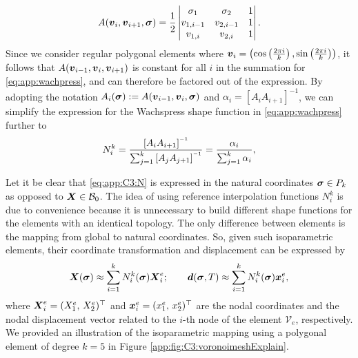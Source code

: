 %
\begin{equation}
A({\boldsymbol{v}}_{i}, {\boldsymbol{v}}_{i+1}, \boldsymbol{\sigma}) = \frac{1}{2} \left| \begin{matrix}
\sigma_1 & \sigma_2 & 1 \\
v_{1,i-1} & v_{2,i-1} & 1 \\
v_{1,i} & v_{2,i} & 1 \\
\end{matrix} \right|.
\end{equation}
%
Since we consider regular polygonal elements where ${\boldsymbol{v}}_i = \left(\cos\left(\frac{2\pi i}{k}\right), \sin\left(\frac{2\pi i}{k}\right)\right)$, it follows that $A({\boldsymbol{v}}_{i-1}, {\boldsymbol{v}}_i, {\boldsymbol{v}}_{i+1})$ is constant for all $i$ in the summation for \eqref{eq:app:wachpress}, and can therefore be factored out of the expression. By adopting the notation $A_i(\boldsymbol{\sigma}) := A({\boldsymbol{v}}_{i-1}, {\boldsymbol{v}}_i, \boldsymbol{\sigma})$ and $\alpha_i = \left[A_i A_{i+1}\right]^{-1}$, we can simplify the expression for the Wachspress shape function in \eqref{eq:app:wachpress} further to
%
\begin{equation}
N^k_i= \frac{\left[A_{i} A_{i+1}\right]\inv}{\sum_{j=1}^k \left[A_{j} A_{j+1}\right]\inv} = \frac{\alpha_i }{\sum_{j=1}^k \alpha_i},
\label{eq:app:C3:N}
\end{equation}
%
\begin{rmk}
Let it be clear that \eqref{eq:app:C3:N} is expressed in the natural coordinates $\boldsymbol{\sigma} \in P_k$ as opposed to ${\boldsymbol{X}} \in \mathcal{B}_0$. The idea of using reference interpolation functions $N^k_i$ is due to convenience because it is unnecessary to build different shape functions for the elements with an identical topology. The only difference between elements is the mapping from global to natural coordinates. So, given such isoparametric elements, their coordinate transformation and displacement can be expressed by
%
\begin{equation*}
{\boldsymbol{X}}(\boldsymbol{\sigma}) \approx \sum^{k}_{i=1} N_{i}^k(\boldsymbol{\sigma}) {\boldsymbol{X}}_i^e;  \quad \quad
{\boldsymbol{d}}(\boldsymbol{\sigma},T) \approx \sum^{k}_{i=1} N_{i}^k(\boldsymbol{\sigma}) {\boldsymbol{x}}_i^e, 
\end{equation*}
%  
where ${\boldsymbol{X}}_{i}^{e} = (X^e_1,\, X^e_2)^\top$ and ${\boldsymbol{x}}_{i}^{e} = (x^e_1,\, x^e_2)^\top$ are the nodal coordinates and the nodal displacement vector related to the $i$-th node of the element $\mathcal{V}_e$, respectively. We provided an illustration of the isoparametric mapping using a polygonal element of degree $k=5$ in Figure \ref{app:fig:C3:voronoimeshExplain}.
\end{rmk}

